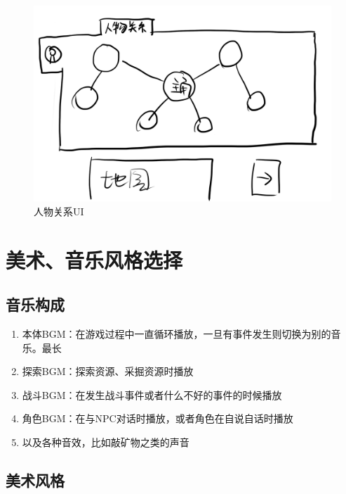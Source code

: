 \documentclass{ctexart}
\begin{document}
		\begin{figure}[H]
			\centering
			\includegraphics[scale=0.2]{material/人物关系UI.png}
			\caption{人物关系UI}
			\label{人物关系UI}
		\end{figure}
		
	\section{美术、音乐风格选择}
		\subsection{音乐构成}
			\begin{enumerate}
				\item 本体BGM：在游戏过程中一直循环播放，一旦有事件发生则切换为别的音乐。最长
				\item 探索BGM：探索资源、采掘资源时播放
				\item 战斗BGM：在发生战斗事件或者什么不好的事件的时候播放
				\item 角色BGM：在与NPC对话时播放，或者角色在自说自话时播放
				\item 以及各种音效，比如敲矿物之类的声音
			\end{enumerate}
		\subsection{美术风格}
\end{document}
